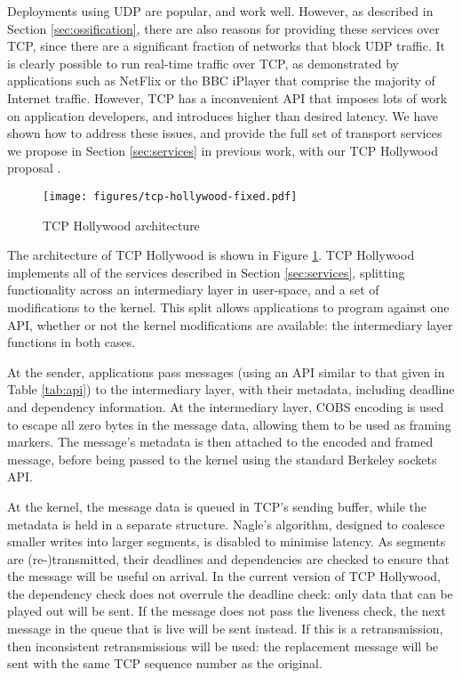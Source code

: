 \documentclass{sig-alternate-05-2015}
\begin{document}
Deployments using UDP are popular, and work well. However, as described in
Section \ref{sec:ossification}, there are also reasons for providing these
services over TCP, since there are a significant fraction of networks that
block UDP traffic. It is clearly possible to run real-time traffic over
TCP, as demonstrated by applications such as NetFlix or the BBC iPlayer
that comprise the majority of Internet traffic. However, TCP has a
inconvenient API that imposes lots of work on application developers, and
introduces higher than desired latency. We have shown how to address these
issues, and provide the full set of transport services we propose in
Section \ref{sec:services} in previous work, with our TCP Hollywood
proposal \cite{mcquistin2016tcp}.

\begin{figure}[t]
 \centering
 \texttt{[image: figures/tcp-hollywood-fixed.pdf]}
  \caption{TCP Hollywood architecture}
\label{diagram:tcp-hollywood}
\end{figure}

The architecture of TCP Hollywood is shown in Figure
\ref{diagram:tcp-hollywood}. TCP Hollywood implements all of the services
described in Section \ref{sec:services}, splitting functionality across
an intermediary layer in user-space, and a set of modifications to the
kernel. This split allows applications to program against one API, whether
or not the kernel modifications are available: the intermediary layer
functions in both cases.

At the sender, applications pass messages (using an API similar to that
given in Table \ref{tab:api}) to the intermediary layer, with their
metadata, including deadline and dependency information. At the
intermediary layer, COBS encoding \cite{CB97COBS} is used to escape all
zero bytes in the message data, allowing them to be used as framing
markers. The message's metadata is then attached to the encoded and framed
message, before being passed to the kernel using the standard Berkeley
sockets API.

At the kernel, the message data is queued in TCP's sending buffer, while
the metadata is held in a separate structure. Nagle's algorithm, designed
to coalesce smaller writes into larger segments, is disabled to minimise
latency. As segments are (re-)transmitted, their deadlines and dependencies
are checked to ensure that the message will be useful on arrival. In the
current version of TCP Hollywood, the dependency check does not overrule
the deadline check: only data that can be played out will be sent. If the
message does not pass the liveness check, the next message in the queue
that is live will be sent instead. If this is a retransmission, then
inconsistent retransmissions will be used: the replacement message will be
sent with the same TCP sequence number as the original.
\end{document}
